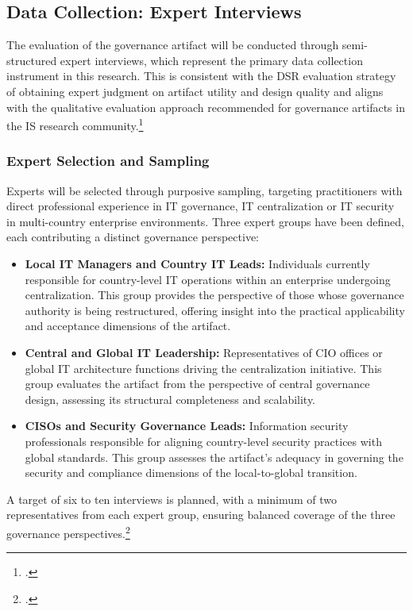 \subsection{Data Collection: Expert Interviews}
\label{subsec:DataCollectionExpertInterviews}
The evaluation of the governance artifact will be conducted through semi-structured expert interviews, which represent the primary data collection instrument in this research.
This is consistent with the \ac{DSR} evaluation strategy of obtaining expert judgment on artifact utility and design quality and aligns with the qualitative evaluation approach recommended for governance artifacts in the IS research community.\footcite[86-87]{hevnerDesignScienceInformation2004}

\subsubsection{Expert Selection and Sampling}
\label{subsubsec:ExpertSelectionAndSampling}
Experts will be selected through purposive sampling, targeting practitioners with direct professional experience in IT governance, IT centralization or IT security in multi-country enterprise environments.
Three expert groups have been defined, each contributing a distinct governance perspective:
\begin{itemize}
    \item \textbf{Local IT Managers and Country IT Leads:} Individuals currently responsible for country-level IT operations within an enterprise undergoing centralization. This group provides the perspective of those whose governance authority is being restructured, offering insight into the practical applicability and acceptance dimensions of the artifact.
    \item \textbf{Central and Global IT Leadership:} Representatives of CIO offices or global IT architecture functions driving the centralization initiative. This group evaluates the artifact from the perspective of central governance design, assessing its structural completeness and scalability.
    \item \textbf{CISOs and Security Governance Leads:} Information security professionals responsible for aligning country-level security practices with global standards. This group assesses the artifact's adequacy in governing the security and compliance dimensions of the local-to-global transition.
\end{itemize}
A target of six to ten interviews is planned, with a minimum of two representatives from each expert group, ensuring balanced coverage of the three governance perspectives.\footcite[55]{peffersDesignScienceResearch2007}

